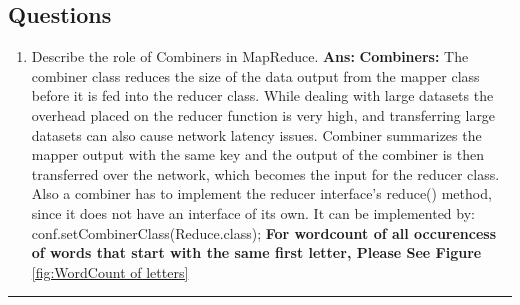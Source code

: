 \documentclass[12pt]{article}
\begin{document}
\subsection{Questions}
\begin{enumerate}
\item  Describe the role of Combiners in MapReduce.
\newline
\newline
\textbf{Ans:}
	\newline
    \newline
    	\textbf{Combiners:}
        \newline
        	The combiner class reduces the size of the data output from the mapper class before it is fed into the reducer class. While dealing with large datasets the overhead placed on the reducer function is very high, and transferring large datasets can also cause network latency issues.
            Combiner summarizes the mapper output with the same key and the output of the combiner is then transferred over the network, which becomes the input for the reducer class. Also a combiner has to implement the reducer interface's reduce() method, since it does not have an interface of its own.
            It can be implemented by:
            	conf.setCombinerClass(Reduce.class); \cite{CC}
         \newline
         \newline
    \textbf{ For wordcount of all occurencess of words that start with the same first letter, Please See Figure} \ref{fig:WordCount of letters}
\end{enumerate}
\hrule
\newpage
\end{document}

